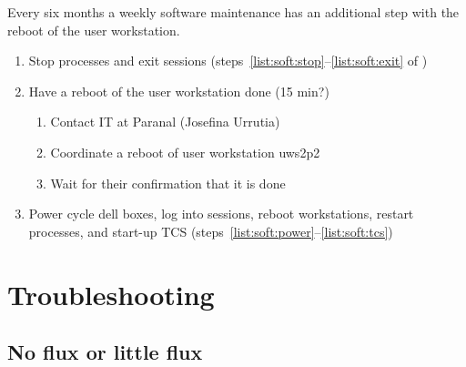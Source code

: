 \documentclass[11pt,fleqn,a4paper]{book}
\begin{document}
Every six months a weekly software maintenance has an additional step with the reboot of the user workstation.

\begin{enumerate}
\item Stop processes and exit sessions (steps~\ref{list:soft:stop}--\ref{list:soft:exit} of )
\item Have a reboot of the user workstation done (15 min?)
    \begin{enumerate}
        \item Contact IT at Paranal (Josefina Urrutia) 
        \item Coordinate a reboot of user workstation \gls{uws2p2}
        \item Wait for their confirmation that it is done
    \end{enumerate}
\item Power cycle dell boxes, log into sessions, reboot workstations, restart processes, and start-up TCS (steps~\ref{list:soft:power}--\ref{list:soft:tcs})
\end{enumerate}


\chapter{Troubleshooting}
\label{chap:trouble}

\section{No flux or little flux}
\label{sec:noflux}
\end{document}

